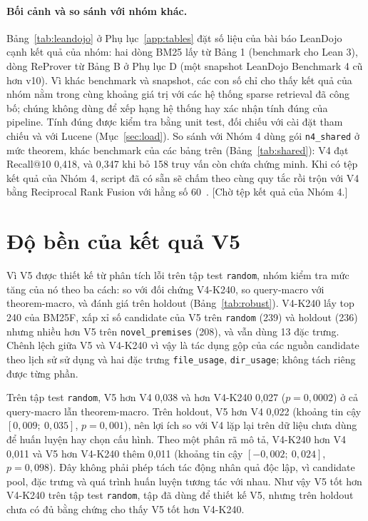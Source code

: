 \documentclass[11pt,a4paper,oneside]{report}
\newcommand{\code}[1]{\texttt{#1}}
\newcommand{\canchot}[1]{\textcolor{red!70!black}{[#1]}}
\begin{document}
\paragraph{Bối cảnh và so sánh với nhóm khác.} Bảng~\ref{tab:leandojo} ở Phụ lục~\ref{app:tables} đặt số liệu của bài báo
LeanDojo~\cite{yang2023} cạnh kết quả của nhóm: hai dòng BM25 lấy từ Bảng 1 (benchmark cho Lean 3), dòng ReProver từ Bảng B
ở Phụ lục D (một snapshot LeanDojo Benchmark 4 cũ hơn v10). Vì khác benchmark và snapshot, các con số chỉ cho thấy kết quả của
nhóm nằm trong cùng khoảng giá trị với các hệ thống sparse retrieval đã công bố; chúng không dùng để xếp hạng hệ thống hay
xác nhận tính đúng của pipeline. Tính đúng được kiểm tra bằng unit test, đối chiếu với cài đặt tham chiếu và với Lucene
(Mục~\ref{sec:load}). So sánh với Nhóm 4 dùng gói \code{n4\_shared} ở mức theorem, khác benchmark của các bảng trên
(Bảng~\ref{tab:shared}): V4 đạt Recall@10 0,418, và 0,347 khi bỏ 158 truy vấn còn chứa chứng minh. Khi có tệp kết quả của
Nhóm 4, script đã có sẵn sẽ chấm theo cùng quy tắc rồi trộn với V4 bằng Reciprocal Rank Fusion với hằng
số 60~\cite{cormack2009}.\label{sec:group4} \canchot{Chờ tệp kết quả của Nhóm 4.}

\section{Độ bền của kết quả V5}\label{sec:robust}

Vì V5 được thiết kế từ phân tích lỗi trên tập test \code{random}, nhóm kiểm tra mức tăng của nó theo ba cách: so với
đối chứng V4-K240, so query-macro với theorem-macro, và đánh giá trên holdout (Bảng~\ref{tab:robust}). V4-K240 lấy top 240
của BM25F, xấp xỉ số candidate của V5 trên \code{random} (239) và holdout (236) nhưng nhiều hơn V5 trên
\code{novel\_premises} (208), và vẫn dùng 13 đặc trưng. Chênh lệch giữa V5 và V4-K240 vì vậy là tác dụng gộp của các nguồn
candidate theo lịch sử sử dụng và hai đặc trưng \code{file\_usage}, \code{dir\_usage}; không tách riêng được từng phần.



Trên tập test \code{random}, V5 hơn V4 0,038 và hơn V4-K240 0,027 ($p = 0{,}0002$) ở cả query-macro lẫn theorem-macro. Trên
holdout, V5 hơn V4 0,022 (khoảng tin cậy $[0{,}009;\ 0{,}035]$, $p = 0{,}001$), nên lợi ích so với V4 lặp lại trên dữ liệu
chưa dùng để huấn luyện hay chọn cấu hình. Theo một phân rã mô tả, V4-K240 hơn V4 0,011 và V5 hơn V4-K240 thêm 0,011
(khoảng tin cậy $[-0{,}002;\ 0{,}024]$, $p = 0{,}098$). Đây không phải phép tách tác động nhân quả độc lập, vì candidate pool,
đặc trưng và quá trình huấn luyện tương tác với nhau. Như vậy V5 tốt hơn V4-K240 trên tập test \code{random}, tập đã dùng để
thiết kế V5, nhưng trên holdout chưa có đủ bằng chứng cho thấy V5 tốt hơn V4-K240.
\end{document}
